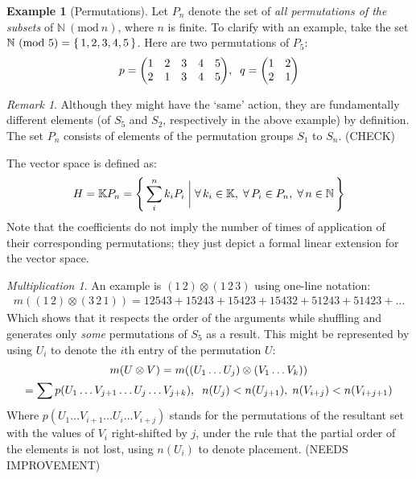 \documentclass{article}
\theoremstyle{definition}
\newtheorem{Example}{Example}
\theoremstyle{remark}
\newtheorem*{Remark*}{Remark}
\theoremstyle{underline}
\newtheorem*{Multiplication*}{Multiplication}
\theoremstyle{underline}
\newcommand{\Mod}[1]{\ (\mathrm{mod}\ #1)}
\begin{document}
\begin{Example}[Permutations]
Let $P_n$ denote the set of \emph{all permutations of the subsets} of $\mathbb N\Mod n$, where $n$ is finite. To clarify with an example, take the set $\mathbb N\Mod 5 = \qty{\, 1,2,3,4,5 \,}$. Here are two permutations of $P_5$:
\begin{gather*}
	p = \mqty(1 & 2 & 3 & 4 & 5 \\ 2 & 1 & 3 & 4 & 5), \;\; q = \mqty(1 & 2 \\ 2 & 1) 
\end{gather*}

\begin{Remark*}
Although they might have the `same' action, they are fundamentally different elements (of $S_5$ and $S_2$, respectively in the above example) by definition. The set $P_n$ consists of elements of the permutation groups $S_1$ to $S_n$. (CHECK)
\end{Remark*}

The vector space is defined as:
\begin{gather*}
	H = \mathbb KP_n = \qty{\, \sum_{i}^n k_iP_i \;\bigg|\; \forall\, k_i \in \mathbb K,\;\forall\, P_i \in P_n,\;\forall\,n \in \mathbb N\,}
\end{gather*}
Note that the coefficients do not imply the number of times of application of their corresponding permutations; they just depict a formal linear extension for the vector space.

\begin{Multiplication*}
An example is $(1 \, 2) \otimes (1 \, 2 \,3)$ using one-line notation:
\begin{gather*}
	m((1 \, 2) \otimes (3 \, 2 \, 1)) = 12543 + 15243 + 15423 + 15432 + 51243 + 51423 + \ldots 
\end{gather*}
Which shows that it respects the order of the arguments while shuffling and generates only \emph{some} permutations of $S_5$ as a result. This might be represented by using $U_i$ to denote the $i$th entry of the permutation $U$:
\begin{gather*}
	m\pqty{U \otimes V} = m\pqty{\pqty{U_1\ldots U_j} \otimes \pqty{V_1\ldots V_k}} \\
	= \sum p(U_1\ldots V_{j + 1} \ldots U_j\ldots V_{j + k}),\;\; n(U_j) < n(U_{j+1}), \; n(V_{i + j}) < n(V_{i + j + 1}) 
\end{gather*}
Where $p(U_1\ldots V_{i + 1} \ldots U_i\ldots V_{i + j})$ stands for the permutations of the resultant set with the values of $V_i$ right-shifted by $j$, under the rule that the partial order of the elements is not lost, using $n(U_i)$ to denote placement. (NEEDS IMPROVEMENT)
\end{Multiplication*}


\end{Example}
\end{document}
